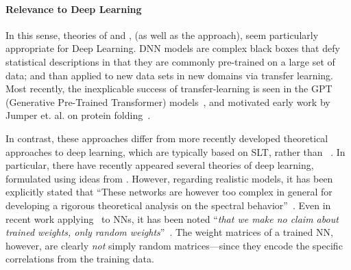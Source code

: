  
 \paragraph{Relevance to Deep Learning}
 In this sense, \SemiEmpirical theories of \NuclearPhysics and \QuantumChemistry,
 (as well as the \RenormalizationGroup approach), seem particularly appropriate
 for Deep Learning.
  DNN models are complex black boxes that defy statistical descriptions in that
  they are commonly pre-trained on a large set of data; and than applied to new data sets in new domains via transfer learning.
  Most recently, the inexplicable success of transfer-learning is seen
in the GPT (Generative Pre-Trained Transformer) models~\cite{Radford2018},
and motivated early work by Jumper et. al. on protein folding~\cite{JKS16_TR}.

In contrast, these \SemiEmpirical approaches differ from more
recently developed theoretical approaches to deep learning, which are typically based on SLT, rather than \STATMECH~\cite{Roberts2021}.
In particular, there have recently appeared several theories of deep learning, formulated using ideas from \RMT.
However, regarding realistic models, it has been explicitly stated that
``These networks are however too complex in general for developing a rigorous theoretical analysis on the spectral behavior''~\cite{LBNx17_TR}.
Even in recent work applying \RMT~to NNs, it has been noted
``\emph{that we make no claim about trained weights, only random weights}''~\cite{Yang2021}.
The weight matrices of a trained NN, however, are clearly \emph{not} simply random matrices---since they encode the specific correlations from the training data.

